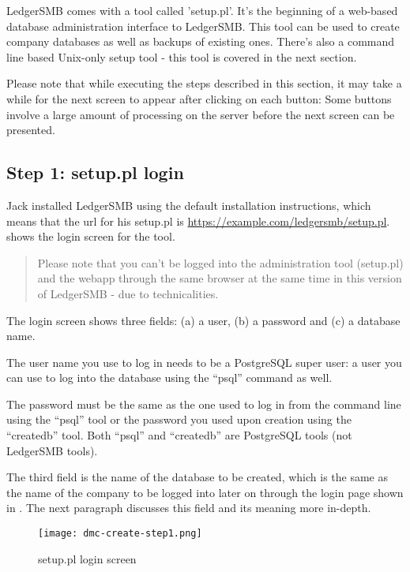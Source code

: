 LedgerSMB comes with a tool called 'setup.pl'. It's the beginning of a web-based
database administration interface to LedgerSMB. This tool can be used to create
company databases as well as backups of existing ones. There's also a command line based
Unix-only setup tool - this tool is covered in the next section.

Please note that while executing the steps described in this section, it may take a while
for the next screen to appear after clicking on each button: Some buttons involve
a large amount of processing on the server before the next screen can be presented.

\subsection{Step 1: setup.pl login}

Jack installed LedgerSMB using the default installation instructions, which means
that the url for his setup.pl is \url{https://example.com/ledgersmb/setup.pl}.
 shows the login screen for the tool.

\begin{quotation}
Please note that you can't be logged into the administration tool (setup.pl) and the webapp
through the same browser at the same time in this version of LedgerSMB - due to technicalities.
\end{quotation}

The login screen shows three fields: (a) a user, (b) a password and (c) a database name.

The user name you use to log in needs to be a PostgreSQL super user: a user you can use
to log into the database using the ``psql'' command as well.

The password must be the same as the one used to log in from the command line using the
``psql'' tool or the password you used upon creation using the ``createdb'' tool. Both
``psql'' and ``createdb'' are PostgreSQL tools (not LedgerSMB tools).

The third field is the name of the database to be created, which is the same as the
name of the company to be logged into later on through the login page shown in . The next paragraph discusses this field and its meaning more
in-depth.

\begin{figure}[h]
\centering
\texttt{[image: dmc-create-step1.png]}
\caption{setup.pl login screen}
\label{fig:setup-step1}
\end{figure}

